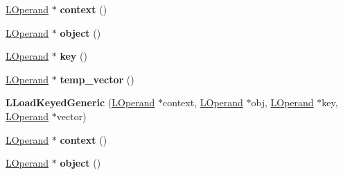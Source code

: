 \begin{DoxyCompactItemize}
\item 
\hyperlink{classv8_1_1internal_1_1_l_operand}{L\+Operand} $\ast$ {\bfseries context} ()\hypertarget{classv8_1_1internal_1_1_l_load_keyed_generic_a522e2bd4a7d1b71a95f891c1fc9a99c8}{}\label{classv8_1_1internal_1_1_l_load_keyed_generic_a522e2bd4a7d1b71a95f891c1fc9a99c8}

\item 
\hyperlink{classv8_1_1internal_1_1_l_operand}{L\+Operand} $\ast$ {\bfseries object} ()\hypertarget{classv8_1_1internal_1_1_l_load_keyed_generic_aadfba9d6286d59cc727bce5ae1b74ee7}{}\label{classv8_1_1internal_1_1_l_load_keyed_generic_aadfba9d6286d59cc727bce5ae1b74ee7}

\item 
\hyperlink{classv8_1_1internal_1_1_l_operand}{L\+Operand} $\ast$ {\bfseries key} ()\hypertarget{classv8_1_1internal_1_1_l_load_keyed_generic_ad55d2217ba38aa46911c0e797a610388}{}\label{classv8_1_1internal_1_1_l_load_keyed_generic_ad55d2217ba38aa46911c0e797a610388}

\item 
\hyperlink{classv8_1_1internal_1_1_l_operand}{L\+Operand} $\ast$ {\bfseries temp\+\_\+vector} ()\hypertarget{classv8_1_1internal_1_1_l_load_keyed_generic_ac529ed41ee727bf1e320ad6711ce2cff}{}\label{classv8_1_1internal_1_1_l_load_keyed_generic_ac529ed41ee727bf1e320ad6711ce2cff}

\item 
{\bfseries L\+Load\+Keyed\+Generic} (\hyperlink{classv8_1_1internal_1_1_l_operand}{L\+Operand} $\ast$context, \hyperlink{classv8_1_1internal_1_1_l_operand}{L\+Operand} $\ast$obj, \hyperlink{classv8_1_1internal_1_1_l_operand}{L\+Operand} $\ast$key, \hyperlink{classv8_1_1internal_1_1_l_operand}{L\+Operand} $\ast$vector)\hypertarget{classv8_1_1internal_1_1_l_load_keyed_generic_ae032327599cdca64b80d9e368ac5a16e}{}\label{classv8_1_1internal_1_1_l_load_keyed_generic_ae032327599cdca64b80d9e368ac5a16e}

\item 
\hyperlink{classv8_1_1internal_1_1_l_operand}{L\+Operand} $\ast$ {\bfseries context} ()\hypertarget{classv8_1_1internal_1_1_l_load_keyed_generic_a522e2bd4a7d1b71a95f891c1fc9a99c8}{}\label{classv8_1_1internal_1_1_l_load_keyed_generic_a522e2bd4a7d1b71a95f891c1fc9a99c8}

\item 
\hyperlink{classv8_1_1internal_1_1_l_operand}{L\+Operand} $\ast$ {\bfseries object} ()\hypertarget{classv8_1_1internal_1_1_l_load_keyed_generic_aadfba9d6286d59cc727bce5ae1b74ee7}{}\label{classv8_1_1internal_1_1_l_load_keyed_generic_aadfba9d6286d59cc727bce5ae1b74ee7}


\end{DoxyCompactItemize}
